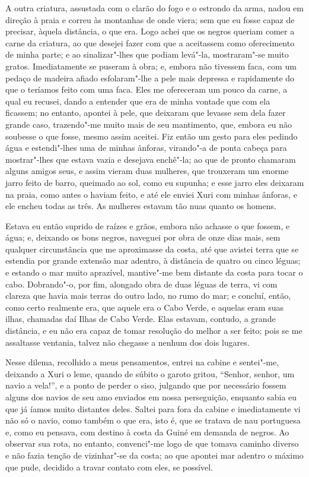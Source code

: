 A outra criatura, assustada com o clarão do fogo e o estrondo da arma,
nadou em direção à praia e correu às montanhas de onde viera; sem que eu
fosse capaz de precisar, àquela distância, o que era. Logo achei que os
negros queriam comer a carne da criatura, ao que desejei fazer com que a
aceitassem como oferecimento de minha parte; e ao sinalizar"-lhes que
podiam levá"-la, mostraram"-se muito gratos. Imediatamente se puseram à
obra; e, embora não tivessem faca, com um pedaço de madeira afiado
esfolaram"-lhe a pele mais depressa e rapidamente do que o teríamos feito
com uma faca. Eles me ofereceram um pouco da carne, a qual eu recusei,
dando a entender que era de minha vontade que com ela ficassem; no
entanto, apontei à pele, que deixaram que levasse sem dela fazer grande
caso, trazendo"-me muito mais de seu mantimento, que, embora eu não
soubesse o que fosse, mesmo assim aceitei. Fiz então um gesto para eles
pedindo água e estendi"-lhes uma de minhas ânforas, virando"-a de ponta
cabeça para mostrar"-lhes que estava vazia e desejava enchê"-la; ao que de
pronto chamaram alguns amigos seus, e assim vieram duas mulheres, que
trouxeram um enorme jarro feito de barro, queimado ao sol, como eu
supunha; e esse jarro eles deixaram na praia, como antes o haviam feito,
e até ele enviei Xuri com minhas ânforas, e ele encheu todas as três. As
mulheres estavam tão nuas quanto os homens.

Estava eu então suprido de raízes e grãos, embora não achasse o que
fossem, e água; e, deixando os bons negros, naveguei por obra de onze
dias mais, sem qualquer circunstância que me aproximasse da costa, até
que avistei terra que se estendia por grande extensão mar adentro, à
distância de quatro ou cinco léguas; e estando o mar muito aprazível,
mantive"-me bem distante da costa para tocar o cabo. Dobrando"-o, por fim,
alongado obra de duas léguas de terra, vi com clareza que havia mais
terras do outro lado, no rumo do mar; e concluí, então, como certo
realmente era, que aquele era o Cabo Verde, e aquelas eram suas ilhas,
chamadas daí Ilhas de Cabo Verde. Elas estavam, contudo, a grande
distância, e eu não era capaz de tomar resolução do melhor a ser feito;
pois se me assaltasse ventania, talvez não chegasse a nenhum dos dois
lugares.

Nesse dilema, recolhido a meus pensamentos, entrei na cabine e
sentei"-me, deixando a Xuri o leme, quando de súbito o garoto gritou,
``Senhor, senhor, um navio a vela!'', e a ponto de perder o siso,
julgando que por necessário fossem alguns dos navios de seu amo enviados
em nossa perseguição, enquanto sabia eu que já íamos muito distantes
deles. Saltei para fora da cabine e imediatamente vi não só o navio,
como também o que era, isto é, que se tratava de nau portuguesa e, como
eu pensava, com destino à costa da Guiné em demanda de negros. Ao
observar sua rota, no entanto, convenci"-me logo de que tomava caminho
diverso e não fazia tenção de vizinhar"-se da costa; ao que apontei mar
adentro o máximo que pude, decidido a travar contato com eles, se
possível.

